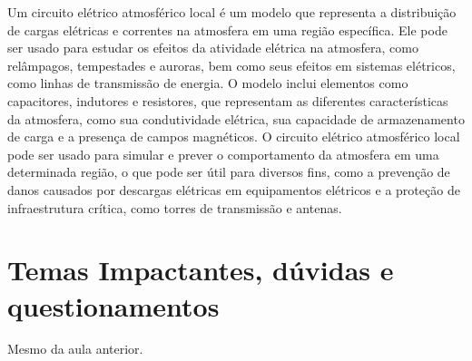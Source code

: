 \documentclass[a4paper, 12pt, onecolumn,singlespacing]{article}
\begin{document}
\begin{itemize}
		Um circuito elétrico atmosférico local é um modelo que representa a distribuição de cargas elétricas e correntes na atmosfera em uma região específica. Ele pode ser usado para estudar os efeitos da atividade elétrica na atmosfera, como relâmpagos, tempestades e auroras, bem como seus efeitos em sistemas elétricos, como linhas de transmissão de energia. O modelo inclui elementos como capacitores, indutores e resistores, que representam as diferentes características da atmosfera, como sua condutividade elétrica, sua capacidade de armazenamento de carga e a presença de campos magnéticos. O circuito elétrico atmosférico local pode ser usado para simular e prever o comportamento da atmosfera em uma determinada região, o que pode ser útil para diversos fins, como a prevenção de danos causados por descargas elétricas em equipamentos elétricos e a proteção de infraestrutura crítica, como torres de transmissão e antenas.
	
	\end{itemize}
	\section{Temas Impactantes, dúvidas e questionamentos}
	Mesmo da aula anterior.
\end{document}
